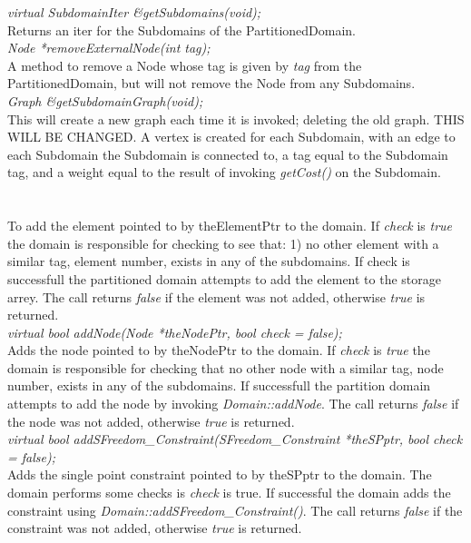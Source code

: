 {\em virtual SubdomainIter \&getSubdomains(void);} \\
Returns an iter for the Subdomains of the PartitionedDomain. \\


{\em Node *removeExternalNode(int tag); } \\
A method to remove a Node whose tag is given by {\em tag} from the PartitionedDomain, 
but will not remove the Node from any Subdomains. \\

{\em Graph \&getSubdomainGraph(void); } \\
This will create a new graph each time it is invoked; deleting the old graph. THIS WILL
BE CHANGED.  A vertex is created for each Subdomain, with an edge to each Subdomain the 
Subdomain is connected to, a tag equal to the Subdomain tag,  and a weight equal to the 
result of invoking {\em getCost()} on the Subdomain. \\

\\
  \\
To add the element pointed to by theElementPtr to the domain. If {\em check}
is {\em true} the domain is responsible for checking to see that: 1)
no other element with a similar tag, element number, exists in any of
the subdomains. If check is successfull the partitioned domain
attempts to add the element to the storage arrey. The call returns
{\em false} if the element was not added, otherwise {\em true} is 
returned.\\   

{\em virtual bool addNode(Node *theNodePtr, bool check = false);}  \\
Adds the node pointed to by theNodePtr to the domain. If {\em check}
is {\em true} the domain is responsible for checking that no other
node with a similar tag, node number, exists in any of the
subdomains. If successfull the partition domain attempts to add the
node by invoking {\em Domain::addNode}. The call returns {\em false} if
the node was not added, otherwise {\em true} is returned. \\  


{\em virtual bool addSFreedom\_Constraint(SFreedom\_Constraint *theSPptr, bool
check = false);}  \\
Adds the single point constraint pointed to by theSPptr to the 
domain. The domain performs some checks is {\em check} is true. If
successful the domain adds the constraint using {\em
Domain::addSFreedom\_Constraint()}. The call returns {\em false} if
the constraint was not added, otherwise {\em true} is returned. \\  


